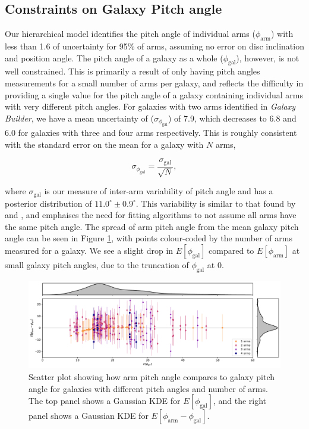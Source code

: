 \subsection{Constraints on Galaxy Pitch angle}
Our hierarchical model identifies the pitch angle of individual arms ($\phi_\mathrm{arm}$) with less than {1.6\degree} of uncertainty for 95\% of arms, assuming no error on disc inclination and position angle. The pitch angle of a galaxy as a whole ($\phi_\mathrm{gal}$), however, is not well constrained. This is primarily a result of only having pitch angles measurements for a small number of arms per galaxy, and reflects the difficulty in providing a single value for the pitch angle of a galaxy containing individual arms with very different pitch angles. For galaxies with two arms identified in \textit{Galaxy Builder}, we have a mean uncertainty of ($\sigma_{\phi_\mathrm{gal}}$) of  {7.9\degree}, which decreases to {6.8\degree} and {6.0\degree} for galaxies with three and four arms respectively. This is roughly consistent with the standard error on the mean for a galaxy with $N$ arms,

\begin{equation}
  \sigma_{\phi_\mathrm{gal}} = \frac{\sigma_\mathrm{gal}}{\sqrt{N}},
\end{equation}

where $\sigma_\mathrm{gal}$ is our measure of inter-arm variability of pitch angle and has a posterior distribution of $11.0^\circ\pm 0.9^\circ$. This variability is similar to that found by \citet{1981AJ.....86.1847K} and \citet{2014ApJ...790...87D}, and emphaises the need for fitting algorithms to not assume all arms have the same pitch angle. The spread of arm pitch angle from the mean galaxy pitch angle can be seen in Figure \ref{fig:arm-pa-spread}, with points colour-coded by the number of arms measured for a galaxy. We see a slight drop in $E[\phi_\mathrm{gal}]$ compared to $E[\phi_\mathrm{arm}]$ at small galaxy pitch angles, due to the truncation of $\phi_\mathrm{gal}$ at {0\degree}.

\begin{figure}
  \includegraphics[width=17.7cm]{plots/arm_pa_spread.pdf}
  \caption{Scatter plot showing how arm pitch angle compares to galaxy pitch angle for galaxies with different pitch angles and number of arms. The top panel shows a Gaussian KDE for $E[\phi_\mathrm{gal}]$, and the right panel shows a Gaussian KDE for $E[\phi_\mathrm{arm} - \phi_\mathrm{gal}]$.}
  \label{fig:arm-pa-spread}
\end{figure}

